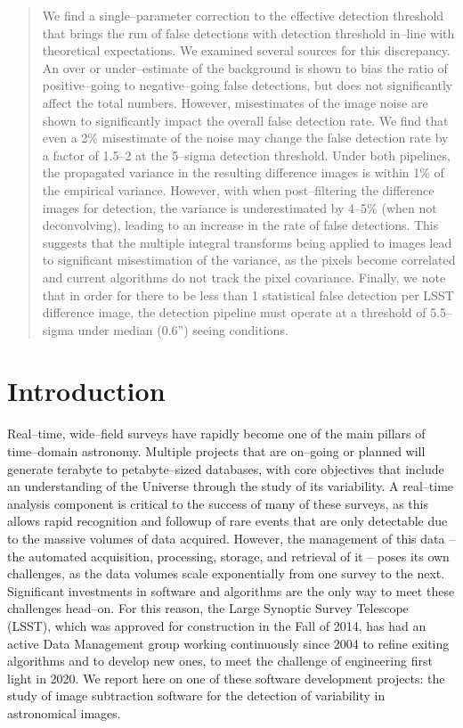 \documentclass[iop]{emulateapj}
\begin{document}
\begin{abstract}
We find a single--parameter correction to the effective detection threshold that brings the run of false detections with detection threshold in--line with theoretical expectations.
We examined several sources for this discrepancy.
An over or under--estimate of the background is shown to bias the ratio of positive--going to negative--going false detections, but does not significantly affect the total numbers.
However, misestimates of the image noise are shown to significantly impact the overall false detection rate.
We find that even a 2\% misestimate of the noise may change the false detection rate by a factor of 1.5--2 at the 5--sigma detection threshold.
Under both pipelines, the propagated variance in the resulting difference images is within 1\% of the empirical variance.
However, with when post--filtering the difference images for detection, the variance is underestimated by 4--5\% (when not deconvolving), leading to an increase in the rate of false detections.
This suggests that the multiple integral transforms being applied to images lead to significant misestimation of the variance, as the pixels become correlated and current algorithms do not track the pixel covariance.
Finally, we note that in order for there to be less than 1 statistical false detection per LSST difference image, the detection pipeline must operate at a threshold of 5.5--sigma under median (0.6'') seeing conditions.

\end{abstract}

\section{Introduction}

Real--time, wide--field surveys have rapidly become one of the main pillars of time--domain astronomy.
Multiple projects that are on--going or planned will generate terabyte to petabyte--sized databases, with core objectives that include an understanding of the Universe through the study of its variability.
A real--time analysis component is critical to the success of many of these surveys, as this allows rapid recognition and followup of rare events that are only detectable due to the massive volumes of data acquired.
However, the management of this data -- the automated acquisition, processing, storage, and retrieval of it -- poses its own challenges, as the data volumes scale exponentially from one survey to the next.
Significant investments in software and algorithms are the only way to meet these challenges head--on.
For this reason, the Large Synoptic Survey Telescope (LSST), which was approved for construction in the Fall of 2014, has had an active Data Management group working continuously since 2004 to refine exiting algorithms and to develop new ones, to meet the challenge of engineering first light in 2020.
We report here on one of these software development projects: the study of image subtraction software for the detection of variability in astronomical images.
\end{document}
